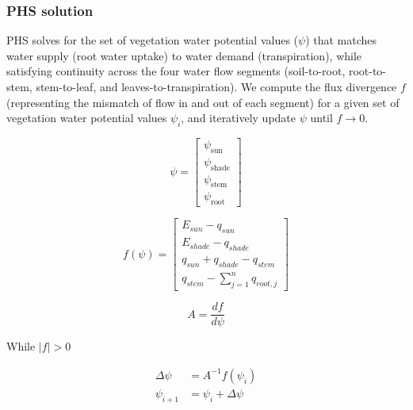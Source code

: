 \documentclass[draft,linenumbers]{agujournal}
\begin{document}
    \subsubsection{PHS solution}
    \label{sect:solution}
    
    PHS solves for the set of vegetation water potential values ($\psi$) that matches water supply
    (root water uptake) to water demand (transpiration), while satisfying continuity across the four water flow
    segments (soil-to-root, root-to-stem, stem-to-leaf, and leaves-to-transpiration). 
    We compute the flux divergence $f$ (representing the mismatch of flow in and out of each segment)
    for a given set of vegetation water potential values $\psi_i$, and iteratively update $\psi$ until $f\to0$.
    
    \begin{linenomath*}
    \begin{equation} 
    \psi = \left[
    \begin{array}{c}
    \psi_{\text{sun}} \\ 
    \psi_{\text{shade}} \\ 
    \psi_{\text{stem}} \\ 
    \psi_{\text{root}}            
    \end{array} \right]
    \end{equation}
    \end{linenomath*}
    
    \begin{linenomath*}
    \begin{equation}
    f\left(\psi\right) = \left[ 
    \begin{array}{c}
    E_{sun}-q_{sun}\\
    E_{shade}-q_{shade}\\
    q_{sun}+q_{shade}-q_{stem}\\
    q_{stem}-\sum_{j=1}^n{q_{root,j}}
    \end{array} \right]
    \end{equation}
    \end{linenomath*}
    
    \begin{linenomath*}
    \begin{equation}
    A = \dfrac{df}{d\psi}
    \end{equation}
    \end{linenomath*}    
    
    While $\left|f\right|>0$
    \begin{linenomath*}
    \begin{equation} \begin{aligned}
    \label{eq:iter}
    \Delta\psi &=A^{-1}f\left(\psi_i\right) \\
    \psi_{i+1}  &= \psi_i + \Delta\psi
    \end{aligned} \end{equation}
    \end{linenomath*}    
    
\end{document}
